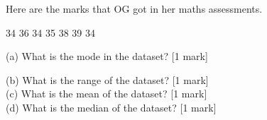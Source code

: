 \documentclass{article}
\begin{document}
\vspace{10pt}
\hline
\vspace{5pt}

Here are the marks that OG got in her maths assessments. \\
\begin{center}
34 \hspace{1cm} 36 \hspace{1cm}  34 \hspace{1cm}  35 \hspace{1cm}  38 \hspace{1cm}  39 \hspace{1cm}  34 \hspace{1cm}     
\end{center}

\begin{flushleft}
(a) What is the mode in the dataset? \hspace{2cm} [1 mark] \\
\vspace{50pt}

(b) What is the range of the dataset? \hspace{2cm} [1 mark] \\
\vspace{50pt}
(c) What is the mean of the dataset? \hspace{2cm} [1 mark] \\
\vspace{50pt}
(d) What is the median of the dataset? \hspace{2cm} [1 mark] \\
\vspace{50pt}
\end{flushleft}

\hline
\vspace{5pt}

\\

\end{document}

